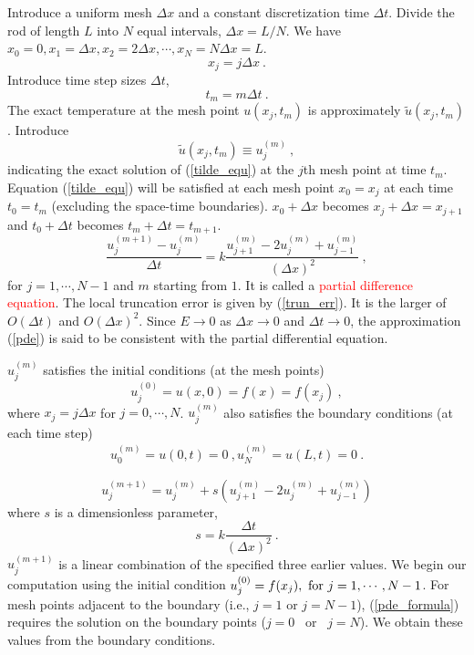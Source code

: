 \documentclass[12pt,a4paper]{article}
\begin{document}
Introduce a uniform mesh $\Delta x$ and a constant discretization time $\Delta t$. Divide the rod of length $L$ into $N$ equal intervals, $\Delta x=L/N$. We have $x_0=0, x_1=\Delta x,x_2=2\Delta x, \cdots,x_N= N\Delta x=L$.
\begin{equation}
x_j = j \Delta x ~.
\end{equation}
Introduce time step sizes $\Delta t$,
\begin{equation}
t_m = m \Delta t ~.
\end{equation}
The exact temperature at the mesh point $u(x_j, t_m)$ is approximately $\tilde{u}(x_j,t_m)$. Introduce 
\begin{equation}
\tilde{u}(x_j,t_m) \equiv u_j^{(m)} ~,
\end{equation}
indicating the exact solution of (\ref{tilde_equ}) at the $j$th mesh point at time $t_m$. Equation  (\ref{tilde_equ}) will be satisfied at each mesh point $x_0=x_j$ at each time $t_0=t_m$ (excluding the space-time boundaries). $x_0+\Delta x$ becomes $x_j+\Delta x=x_{j+1}$ and $t_0+\Delta t$ becomes $t_m+\Delta t=t_{m+1}$.
\begin{equation}
\frac{u_j^{(m+1)} -u_j^{(m)} }{\Delta t} = k\frac{u_{j+1}^{(m)} -2u_{j}^{(m)} + u_{j-1}^{(m)} }{(\Delta x)^2} ~,
\label{pde}
\end{equation}
for $j=1, \cdots ,N-1$ and $m$ starting from $1$. It is called a \textcolor{red}{partial difference equation}. The local truncation error is given by (\ref{trun_err}). It is the larger of $O(\Delta t)$ and $O(\Delta x)^2$. Since $E \rightarrow 0$ as $\Delta x \rightarrow 0$ and $\Delta t \rightarrow 0$, the approximation (\ref{pde}) is said to be consistent with the partial differential equation.

$u_j^{(m)}$ satisfies the initial conditions (at the mesh points)
\begin{equation}
u_j^(0) = u(x,0) = f(x) = f(x_j) ~,
\end{equation}
where $x_j=j\Delta x$ for $j=0, \cdots, N$. $u_j^{(m)}$ also satisfies the boundary conditions (at each time step)
\begin{align}
u_0^{(m)} = u(0, t) = 0 ~,
u_N^{(m)} = u(L, t) = 0 ~.
\end{align}

\begin{equation}
u_j^{(m+1)}  = u_j^{(m)}  +s\left(u_{j+1}^{(m)} -2u_j^{(m)} +u_{j-1}^{(m)} \right)
\label{pde_formula}
\end{equation}
where $s$ is a dimensionless parameter,
\begin{equation}
s = k \dfrac{\Delta t}{(\Delta x)^2} ~.
\end{equation}
$u_j^{(m+1)}$ is a linear combination of the specified three earlier values. We begin our computation using the initial condition $u_j^{(0)} = f(x_j), ~{\rm for}~ j =1, \cdots, N-1$. For mesh points adjacent to the boundary (i.e., $j=1$ or $j=N-1$), (\ref{pde_formula}) requires the solution on the boundary points ($j=0$~ or ~$j=N$). We obtain these values from the boundary conditions.
\end{document}
